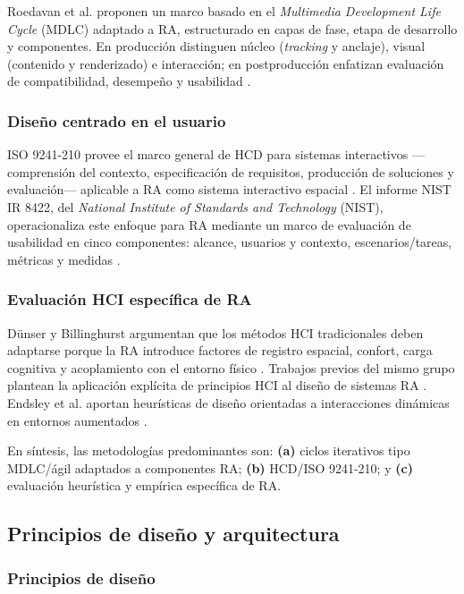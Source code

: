 \documentclass[conference]{IEEEtran}
\begin{document}
Roedavan et al. proponen un marco basado en el \textit{Multimedia Development Life Cycle} (MDLC) adaptado a RA, estructurado en capas de fase, etapa de desarrollo y componentes. En producción distinguen núcleo (\textit{tracking} y anclaje), visual (contenido y renderizado) e interacción; en postproducción enfatizan evaluación de compatibilidad, desempeño y usabilidad \cite{Roedavan2025}.

\subsubsection{Diseño centrado en el usuario}

ISO 9241-210 provee el marco general de HCD para sistemas interactivos —comprensión del contexto, especificación de requisitos, producción de soluciones y evaluación— aplicable a RA como sistema interactivo espacial \cite{ISO9241210}. El informe NIST IR 8422, del \textit{National Institute of Standards and Technology} (NIST), operacionaliza este enfoque para RA mediante un marco de evaluación de usabilidad en cinco componentes: alcance, usuarios y contexto, escenarios/tareas, métricas y medidas \cite{NIST2022}.

\subsubsection{Evaluación HCI específica de RA}

Dünser y Billinghurst argumentan que los métodos HCI tradicionales deben adaptarse porque la RA introduce factores de registro espacial, confort, carga cognitiva y acoplamiento con el entorno físico \cite{Dunser2011}. Trabajos previos del mismo grupo plantean la aplicación explícita de principios HCI al diseño de sistemas RA \cite{Dunser2007}. Endsley et al. aportan heurísticas de diseño orientadas a interacciones dinámicas en entornos aumentados \cite{Endsley2017}.

En síntesis, las metodologías predominantes son: \textbf{(a)} ciclos iterativos tipo MDLC/ágil adaptados a componentes RA; \textbf{(b)} HCD/ISO 9241-210; y \textbf{(c)} evaluación heurística y empírica específica de RA.

\subsection{Principios de diseño y arquitectura}

\subsubsection{Principios de diseño}
\end{document}
